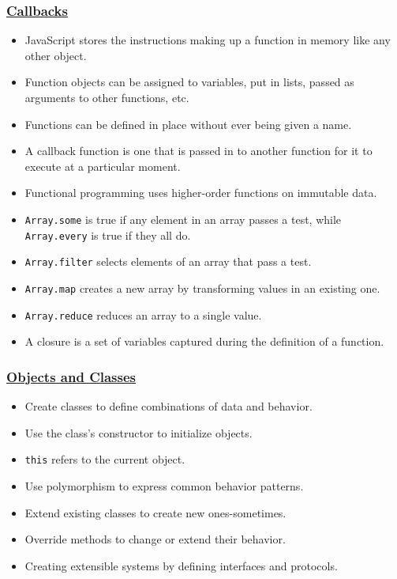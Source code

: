 \subsubsection{\texorpdfstring{\protect\hyperlink{s:callbacks}{Callbacks}}{Callbacks}}\label{null}

\begin{itemize}
\tightlist
\item
  JavaScript stores the instructions making up a function in memory like
  any other object.
\item
  Function objects can be assigned to variables, put in lists, passed as
  arguments to other functions, etc.
\item
  Functions can be defined in place without ever being given a name.
\item
  A callback function is one that is passed in to another function for
  it to execute at a particular moment.
\item
  Functional programming uses higher-order functions on immutable data.
\item
  \texttt{Array.some} is true if any element in an array passes a test,
  while \texttt{Array.every} is true if they all do.
\item
  \texttt{Array.filter} selects elements of an array that pass a test.
\item
  \texttt{Array.map} creates a new array by transforming values in an
  existing one.
\item
  \texttt{Array.reduce} reduces an array to a single value.
\item
  A closure is a set of variables captured during the definition of a
  function.
\end{itemize}

\subsubsection{\texorpdfstring{\protect\hyperlink{s:oop}{Objects and
Classes}}{Objects and Classes}}\label{null}

\begin{itemize}
\tightlist
\item
  Create classes to define combinations of data and behavior.
\item
  Use the class's constructor to initialize objects.
\item
  \texttt{this} refers to the current object.
\item
  Use polymorphism to express common behavior patterns.
\item
  Extend existing classes to create new ones-sometimes.
\item
  Override methods to change or extend their behavior.
\item
  Creating extensible systems by defining interfaces and protocols.
\end{itemize}

